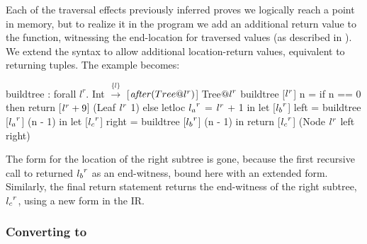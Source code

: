 Each of the traversal effects previously inferred proves we logically reach a
point in memory, but to realize it in the program we add an
additional return value to the function, witnessing the end-location for
traversed values (as described in \cite{ecoop17-gibbon}).
%
We extend the syntax to allow additional location-return values,
equivalent to returning tuples.  The  example becomes:
%

\begin{code}
buildtree : forall $l^r$. Int $\xrightarrow{\{l\}}$ [$\mathit{after}(Tree @ {l}^{r})$] Tree${@l}^{r}$
buildtree [${l}^{r}$]  n =
  if n == 0 then return [${l}^{r}+9$] (Leaf ${l}^{r}$ 1)
  else letloc ${l_a}^{r}$ = ${l}^{r}$ + 1 in
       let [${l_b}^{r}$] left = buildtree [${l_a}^{r}$] (n - 1) in
       let [${l_c}^{r}$] right = buildtree [${l_b}^{r}$] (n - 1) in
       return [${l_c}^{r}$] (Node ${l}^{r}$ left right)
\end{code}%


The  form for the location of the right subtree is gone, because
the first recursive call to  returned ${l_b}^{r}$ as an end-witness,
bound here with an extended  form.
Similarly, the final return statement returns the end-witness of the right subtree,
${l_c}^{r}$, using a new  form in the IR.

\subsubsection{Converting to \lamcur}
\label{sec:cursorize}

